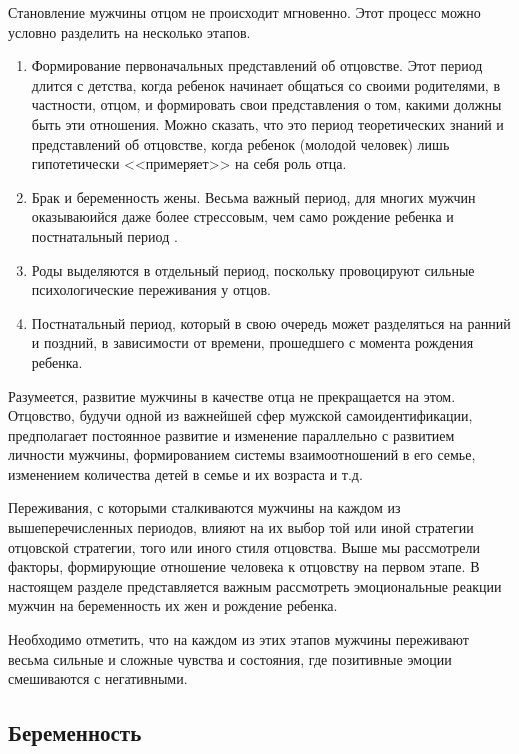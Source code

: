 \documentclass{../../common/thesisbyxetex}
\begin{document}
Становление мужчины отцом не происходит мгновенно. Этот процесс можно условно разделить на
несколько этапов.

\begin{enumerate}
	\item Формирование первоначальных представлений об отцовстве. Этот период длится с детства,
когда ребенок начинает общаться со своими родителями, в частности, отцом, и формировать свои
представления о том, какими должны быть эти отношения. Можно сказать, что это период теоретических
знаний и представлений об отцовстве, когда ребенок (молодой человек) лишь гипотетически 
<<примеряет>>
на себя роль отца.

\item Брак и беременность жены. Весьма важный период, для многих мужчин  оказываюийся даже более
стрессовым, чем само рождение ребенка и постнатальный период  \cite[313]{flit}.

\item Роды выделяются в отдельный период, поскольку провоцируют сильные психологические переживания
у отцов.

\item Постнатальный период, который в свою очередь может разделяться на ранний и поздний, в
зависимости от времени, прошедшего с момента рождения ребенка.

\end{enumerate}

Разумеется, развитие мужчины в качестве отца не прекращается на этом. Отцовство, будучи одной из
важнейшей сфер мужской самоидентификации, предполагает постоянное развитие и изменение параллельно
с развитием личности мужчины, формированием системы взаимоотношений в его семье, изменением
количества детей в семье и их возраста и т.д.

Переживания, с которыми сталкиваются мужчины на каждом из вышеперечисленных периодов, влияют на их
выбор той или иной стратегии отцовской стратегии, того или иного стиля отцовства. Выше мы
рассмотрели факторы, формирующие отношение человека к отцовству на первом этапе.  В настоящем
разделе представляется важным рассмотреть эмоциональные реакции мужчин на беременность их жен и
рождение ребенка.

Необходимо отметить, что на каждом из этих этапов мужчины переживают весьма сильные и сложные
чувства и состояния, где позитивные эмоции смешиваются с негативными.

\subsection{Беременность}
\end{document}
